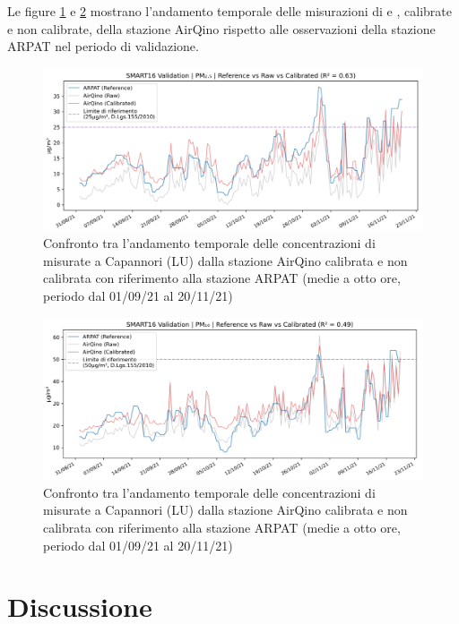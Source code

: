 Le figure \ref{fig:val-pm2.5} e \ref{fig:val-pm10} mostrano l'andamento temporale delle misurazioni di  e , calibrate e non calibrate, della stazione AirQino rispetto alle osservazioni della stazione ARPAT nel periodo di validazione.

\vspace{8mm}
\begin{figure}[H]
\centering
\includegraphics[width=\textwidth,height=\textheight,keepaspectratio]{img/val_pm2.5}
\caption{Confronto tra l'andamento temporale delle concentrazioni di  misurate a Capannori (LU) dalla stazione AirQino calibrata e non calibrata con riferimento alla stazione ARPAT (medie a otto ore, periodo dal 01/09/21 al 20/11/21)}
\label{fig:val-pm2.5}
\end{figure}

\begin{figure}[H]
\centering
\includegraphics[width=\textwidth,height=\textheight,keepaspectratio]{img/val_pm10}
\caption{Confronto tra l'andamento temporale delle concentrazioni di  misurate a Capannori (LU) dalla stazione AirQino calibrata e non calibrata con riferimento alla stazione ARPAT (medie a otto ore, periodo dal 01/09/21 al 20/11/21)}
\label{fig:val-pm10}
\end{figure}

\section{Discussione}\label{sec:discussione}

